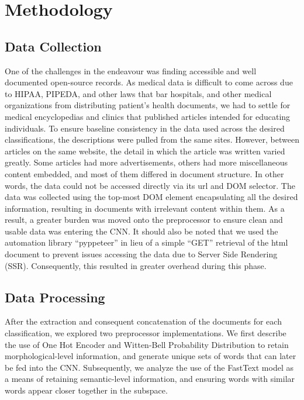 \documentclass[12pt]{report}
\begin{document}
\chapter{Methodology}
\section{Data Collection}
One of the challenges in the endeavour was finding accessible and well
documented open-source records. As medical data is difficult to come across due
to HIPAA, PIPEDA, and other laws that bar hospitals, and other medical
organizations from distributing patient’s health documents, we had to settle
for medical encyclopedias and clinics that published articles intended for
educating individuals. To ensure baseline consistency in the data used across
the desired classifications, the descriptions were pulled from the same sites.
However, between articles on the same website, the detail in which the article
was written varied greatly. Some articles had more advertisements, others had
more miscellaneous content embedded, and most of them differed in document
structure. In other words, the data could not be accessed directly via its url
and DOM selector. The data was collected using the top-most DOM element
encapsulating all the desired information, resulting in documents with
irrelevant content within them.  As a result, a greater burden was moved onto
the preprocessor to ensure clean and usable data was entering the CNN. It
should also be noted that we used the automation library “pyppeteer” in lieu of
a simple “GET” retrieval of the html document to prevent issues accessing the
data due to Server Side Rendering (SSR). Consequently, this resulted in greater
overhead during this phase.

\section{Data Processing}
After the extraction and consequent concatenation of the documents for each
classification, we explored two preprocessor implementations. We first describe
the use of One Hot Encoder and Witten-Bell Probability Distribution to retain
morphological-level information, and generate unique sets of words that can
later be fed into the CNN. Subsequently, we analyze the use of the FastText
model as a means of retaining semantic-level information, and ensuring words
with similar words appear closer together in the subspace.
\end{document}
